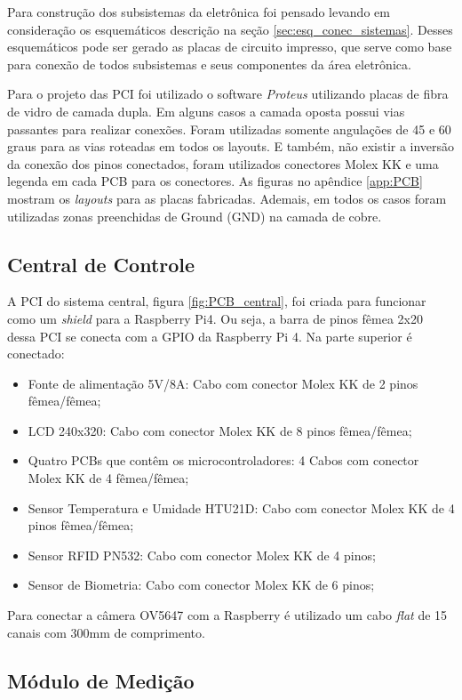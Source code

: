 Para construção dos subsistemas da eletrônica foi pensado levando em consideração os esquemáticos descrição na seção \ref{sec:esq_conec_sistemas}. Desses esquemáticos pode ser gerado as placas de circuito impresso, que serve como base para conexão de todos subsistemas e seus componentes da área eletrônica. 

Para o projeto das PCI foi utilizado o software \textit{Proteus} utilizando placas de fibra de vidro de camada dupla. Em alguns casos a camada oposta possui vias passantes para realizar conexões. Foram utilizadas somente angulações de 45 e 60 graus para as vias roteadas em todos os layouts. E também, não existir a inversão da conexão dos pinos conectados, foram utilizados conectores Molex KK e uma legenda em cada PCB para os conectores. As figuras no apêndice \ref{app:PCB} mostram os \textit{layouts} para as placas fabricadas. Ademais, em todos os casos foram utilizadas zonas preenchidas de Ground (GND) na camada de cobre.

\subsection{Central de Controle}

A PCI do sistema central, figura \ref{fig:PCB_central}, foi criada para funcionar como um \textit{shield} para a Raspberry Pi4. Ou seja, a barra de pinos fêmea 2x20 dessa PCI se conecta com a GPIO da Raspberry Pi 4. Na parte superior é conectado:

\begin{itemize}
    \item Fonte de alimentação 5V/8A: Cabo com conector Molex KK de 2 pinos fêmea/fêmea;
    \item LCD 240x320: Cabo com conector Molex KK de 8 pinos fêmea/fêmea;
    \item Quatro PCBs que contêm os microcontroladores: 4 Cabos com conector Molex KK de 4 fêmea/fêmea;
    \item Sensor Temperatura e Umidade HTU21D: Cabo com conector Molex KK de 4 pinos fêmea/fêmea;
    \item Sensor RFID PN532: Cabo com conector Molex KK de 4 pinos;
    \item Sensor de Biometria: Cabo com conector Molex KK de 6 pinos;
\end{itemize}

Para conectar a câmera OV5647 com a Raspberry é utilizado um cabo \textit{flat} de 15 canais com 300mm de comprimento. 

\subsection{Módulo de Medição}

